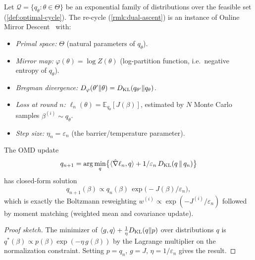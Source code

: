 \begin{proposition}
\label{prop:omd}
Let $\mathcal{Q} = \{q_\theta : \theta \in \Theta\}$ be an exponential family of distributions over the feasible set (\cref{def:optimal-cycle}). The re-cycle (\cref{rmk:dual-ascent}) is an instance of Online Mirror Descent~\cite{Nemirovski-Yudin,Shalev-Shwartz} with:
\begin{itemize}
\item \emph{Primal space:} $\Theta$ (natural parameters of $q_\theta$).
\item \emph{Mirror map:} $\varphi(\theta) = \log Z(\theta)$ (log-partition function, i.e.\ negative entropy of $q_\theta$).
\item \emph{Bregman divergence:} $D_\varphi(\theta' \| \theta) = D_{\operatorname{KL}}(q_{\theta'} \| q_\theta)$.
\item \emph{Loss at round $n$:} $\ell_n(\theta) = \mathbb{E}_{q_\theta}[J(\beta)]$, estimated by $N$ Monte Carlo samples $\beta^{(i)} \sim q_\theta$.
\item \emph{Step size:} $\eta_n = \varepsilon_n$ (the barrier/temperature parameter).
\end{itemize}
The OMD update
\[
q_{n+1} = \arg\min_q \bigl\{\langle \hat{\nabla}\ell_n, q\rangle + 1/\varepsilon_n\, D_{\operatorname{KL}}(q \,\|\, q_n)\bigr\}
\]
has closed-form solution
\[
q_{n+1}(\beta) \propto q_n(\beta)\,\exp\!\bigl(-J(\beta)/\varepsilon_n\bigr),
\]
which is exactly the Boltzmann reweighting $w^{(i)} \propto \exp(-J^{(i)}/\varepsilon_n)$ followed by moment matching (weighted mean and covariance update).
\end{proposition}

\begin{proof}[Proof sketch]
The minimizer of $\langle g, q\rangle + \frac{1}{\eta} D_{\operatorname{KL}}(q \| p)$ over distributions $q$ is $q^*(\beta) \propto p(\beta)\exp(-\eta\, g(\beta))$ by the Lagrange multiplier on the normalization constraint. Setting $p = q_n$, $g = J$, $\eta = 1/\varepsilon_n$ gives the result.
\end{proof}

